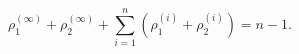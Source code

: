\begin{equation}
\label{erelation}
\rho_1^{(\infty)} + \rho_2^{(\infty)} + \sum\limits_{i=1}^{n} \left(
\rho_1^{(i)} + \rho_2^{(i)} \right) = n-1.
\end{equation}

